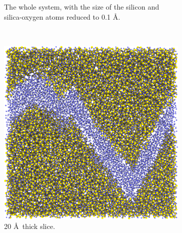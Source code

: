 \begin{figure}[!p]
\begin{subfigure}[t]{\myfigwidth}
        \caption{The whole system, with the size of the silicon and silica-oxygen atoms reduced to 0.1 \AA.}%
    \end{subfigure}%
    \vspace{10pt}\\%
    \begin{subfigure}[t]{\myfigwidth}%
        \centering%
        \includegraphics[width=\textwidth]{images/systems/trimmed-rough_fracture05_02_20ang}%
        \caption{20 \AA\ thick slice.}%
    \end{subfigure}%
    \hfill%
        \begin{subfigure}[t]{\myfigwidth}%
        \centering%

\end{subfigure}
\end{figure}
